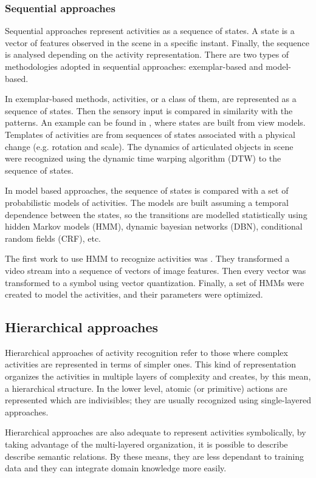 \subsubsection{Sequential approaches} 

Sequential approaches represent activities as a sequence of states. 
A state is a vector of features observed in the scene in a specific instant.
Finally, the sequence is analysed depending on the activity representation.
There are two types of methodologies adopted in sequential approaches: exemplar-based and model-based.

In exemplar-based methods, activities, or a class of them, are represented as a sequence of states. 
Then the sensory input is compared in similarity with the patterns.
An example can be found in \citep{Darrell1993_STGestures}, where states are built from view models.
Templates of activities are from sequences of states associated with a physical change (e.g. rotation and scale).
The dynamics of articulated objects in scene were recognized using the dynamic time warping algorithm (DTW) to the sequence of states.

In model based approaches, the sequence of states is compared with a set of probabilistic models of activities. The models are built assuming a temporal dependence between the states, so the transitions are modelled statistically using hidden Markov models (HMM), dynamic bayesian networks (DBN), conditional random fields (CRF), etc.

The first work to use HMM to recognize activities was \citep{Yamato1992_RecHA_HMM}. They transformed a video stream into a sequence of vectors of image features. Then every vector was transformed to a symbol using vector quantization. Finally, a set of HMMs were created to model the activities, and their parameters were optimized. 

\subsection{Hierarchical approaches}
Hierarchical approaches of activity recognition refer to those where complex activities are represented in terms of simpler ones. 
This kind of representation organizes the activities in multiple layers of complexity and creates, by this mean, a hierarchical structure.
In the lower level, atomic (or primitive) actions are represented which are indivisibles; they are usually recognized using single-layered approaches.

Hierarchical approaches are also adequate to represent activities symbolically, by taking advantage of the multi-layered organization, it is possible to describe describe semantic relations.
By these means, they are less dependant to training data and they can integrate domain knowledge more easily.

